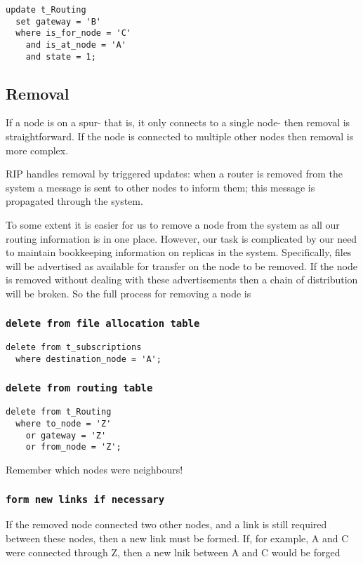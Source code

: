 \documentclass{cmspaper}
\begin{document}
{\small\begin{verbatim}
update t_Routing
  set gateway = 'B'
  where is_for_node = 'C'
    and is_at_node = 'A'
    and state = 1;
\end{verbatim}}

\subsection{Removal}
If a node is on a spur- that is, it only connects to a single node- then removal is straightforward. If the node is connected to multiple other nodes then removal is more complex.

RIP handles removal by triggered updates: when a router is removed from the system a message is sent to other nodes to inform them; this message is propagated through the system. 

To some extent it is easier for us to remove a node from the system as all our routing information is in one place. However, our task is complicated by our need to maintain bookkeeping information on replicas in the system. Specifically, files will be advertised as available for transfer on the node to be removed. If the node is removed without dealing with these advertisements then a chain of distribution will be broken. So the full process for removing a node is

\subsubsection{\textbf{\texttt{delete from file allocation table}}}
{\small\begin{verbatim}
delete from t_subscriptions
  where destination_node = 'A';
\end{verbatim}}

\subsubsection{\textbf{\texttt{delete from routing table}}}

{\small\begin{verbatim}
delete from t_Routing
  where to_node = 'Z'
    or gateway = 'Z'
    or from_node = 'Z';
\end{verbatim}}

Remember which nodes were neighbours!

\subsubsection{\textbf{\texttt{form new links if necessary}}}
If the removed node connected two other nodes, and a link is still required between these nodes, then a new link must be formed. If, for example, A and C were connected through Z, then a new lnik between A and C would be forged
\end{document}
